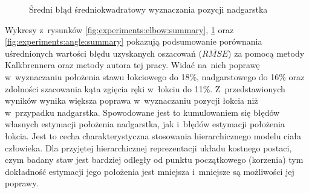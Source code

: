 \begin{savenotes}
	\begin{figure}[!htb]
		\centering
		\caption{Średni błąd średniokwadratowy wyznaczania pozycji nadgarstka}
		\label{fig:experiments:wrist:summary}
	\end{figure}
\end{savenotes}

Wykresy z~rysunków \ref{fig:experiments:elbow:summary}, \ref{fig:experiments:wrist:summary} oraz \ref{fig:experiments:angle:summary} pokazują podsumowanie porównania uśrednionych wartości błędu uzyskanych oszacowań ($\overline{RMSE}$) za pomocą metody Kalkbrennera oraz metody autora tej pracy.
Widać na~nich poprawę w~wyznaczaniu położenia stawu łokciowego do 18\%, nadgarstowego do 16\% oraz zdolności szacowania kąta zgięcia ręki w~łokciu do 11\%. Z~przedstawionych wyników wynika większa poprawa w~wyznaczaniu pozycji łokcia niż w~przypadku nadgarstka. Spowodowane jest to kumulowaniem się błędów własnych estymacji położenia nadgarstka, jak i~błędów estymacji położenia łokcia. Jest to cecha charakterystyczna stosowania hierarchicznego modelu ciała człowieka. Dla przyjętej hierarchicznej reprezentacji układu kostnego postaci, czym badany staw jest bardziej odległy od punktu początkowego (korzenia) tym dokładność estymacji jego położenia jest mniejsza i~mniejsze są możliwości jej poprawy.\\

